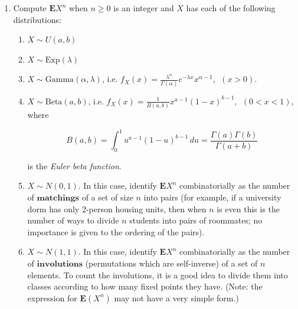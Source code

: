 \documentclass[11pt]{report}
\theoremstyle{plain}
\theoremstyle{definition}
\begin{document}
\begin{enumerate}[label=\arabic*.]
(b) Prove that the Euler gamma function satisfies for
all $t>0$ the identity

\[
\Gamma(t+1)=t\,\Gamma(t).
\]

\noindent (This identity immediately implies the fact that
$\Gamma(n+1)=n!$ for integer $n\ge 0$.)

(c) Find a formula for the values of $\Gamma(\cdot)$
at half-integers, that is,

\[
\Gamma\left(n+\tfrac12\right) =\ ?, \qquad (n\ge 0).
\]

\item Compute $\mathbf{E} X^n$ when $n\ge 0$ is an integer
and $X$ has each of the following distributions:

\begin{enumerate}[label=(\alph*)]
\item $X\sim U(a,b)$

\item $X\sim \textrm{Exp}(\lambda)$

\item $X\sim \textrm{Gamma}(\alpha, \lambda)$, i.e.
$f_{X}(x) =
\frac{\lambda^\alpha}{\Gamma(\alpha)}e^{-\lambda x}
x^{\alpha-1}, \ \  (x>0)$.

\item $X\sim \textrm{Beta}(a, b)$, i.e.
$f_X(x) = \frac{1}{B(a,b)} x^{a-1} (1-x)^{b-1}, \ \
(0<x<1)$,
where

\[
B(a,b)=\int_0^1 u^{a-1}(1-u)^{b-1}\,du = \frac{\Gamma(a)\Gamma(b)}{\Gamma(a+b)}
\]

\noindent is the \emph{Euler beta function}.

\item $X\sim N(0,1)$. In this case, identify
$\mathbf{E} X^n$ combinatorially as the number of
$\textbf{matchings}$ of a set of size $n$ into pairs
(for example, if a university dorm has only 2-person
housing units, then when $n$ is even this is the
number of ways to divide $n$ students into pairs of
roommates; no importance is given to the ordering of
the pairs).

\item $X\sim N(1,1)$. In this case, identify
$\mathbf{E} X^n$ combinatorially as the number of
$\textbf{involutions}$ (permutations which are
self-inverse) of a set of $n$ elements. To count the
involutions, it is a good idea to divide them into
classes according to how many fixed points they have.
(Note: the expression for $\mathbf{E}(X^n)$ may not
have a very simple form.)
\end{enumerate}


\end{enumerate}
\end{document}
